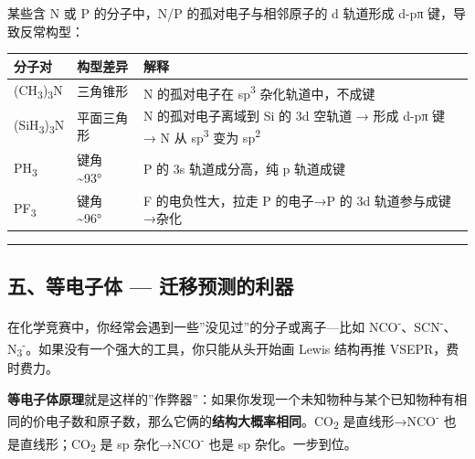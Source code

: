 某些含 N 或 P 的分子中，N/P 的孤对电子与相邻原子的 d 轨道形成 d-pπ 键，导致反常构型：

{\def\LTcaptype{none} %
\begin{longtable}[]{@{}
  >{\raggedright\arraybackslash}p{}
  >{\raggedright\arraybackslash}p{}
  >{\raggedright\arraybackslash}p{}@{}}
\toprule\noalign{}
\begin{minipage}[b]{\linewidth}\raggedright
分子对
\end{minipage} & \begin{minipage}[b]{\linewidth}\raggedright
构型差异
\end{minipage} & \begin{minipage}[b]{\linewidth}\raggedright
解释
\end{minipage} \\
\midrule\noalign{}
\endhead
\bottomrule\noalign{}
\endlastfoot
(CH\textsubscript{3})\textsubscript{3}N & 三角锥形 & N 的孤对电子在 sp\textsuperscript{3} 杂化轨道中，不成键 \\
(SiH\textsubscript{3})\textsubscript{3}N & 平面三角形 & N 的孤对电子离域到 Si 的 3d 空轨道 → 形成 d-pπ 键 → N 从 sp\textsuperscript{3} 变为 sp\textsuperscript{2} \\
PH\textsubscript{3} & 键角 \textasciitilde93° & P 的 3s 轨道成分高，纯 p 轨道成键 \\
PF\textsubscript{3} & 键角 \textasciitilde96° & F 的电负性大，拉走 P 的电子→P 的 3d 轨道参与成键→杂化 \\
\end{longtable}
}

\begin{center}\rule{0.5\linewidth}{0.5pt}\end{center}

\subsection{五、等电子体 --- 迁移预测的利器}\label{ux4e94ux7b49ux7535ux5b50ux4f53-ux8fc1ux79fbux9884ux6d4bux7684ux5229ux5668}

在化学竞赛中，你经常会遇到一些''没见过''的分子或离子---比如 NCO\textsuperscript{-}、SCN\textsuperscript{-}、N\textsubscript{3}\textsuperscript{-}。如果没有一个强大的工具，你只能从头开始画 Lewis 结构再推 VSEPR，费时费力。

\textbf{等电子体原理}就是这样的''作弊器''：如果你发现一个未知物种与某个已知物种有相同的价电子数和原子数，那么它俩的\textbf{结构大概率相同}。CO\textsubscript{2} 是直线形→NCO\textsuperscript{-} 也是直线形；CO\textsubscript{2} 是 sp 杂化→NCO\textsuperscript{-} 也是 sp 杂化。一步到位。

